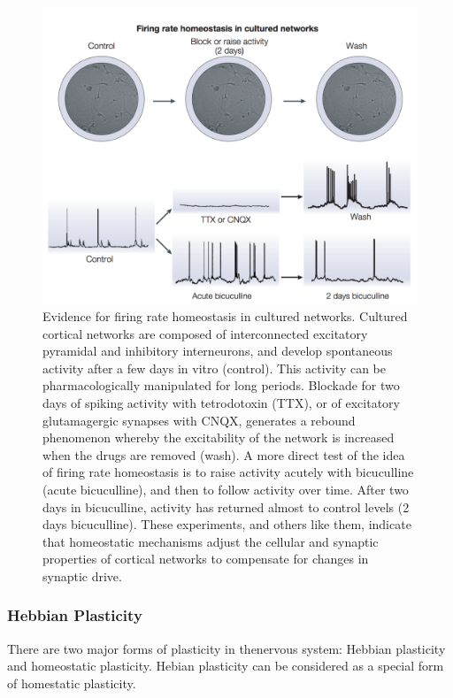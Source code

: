 \documentclass[main]{subfiles}
\begin{document}
\begin{figure}[H]
    \centering
    \includegraphics[width=.9\textwidth]{03_PlasticityInTheBrain/figures/firing_rate_homestatis.png}
    \caption{Evidence for firing rate homeostasis in cultured networks. Cultured cortical networks are composed of interconnected excitatory pyramidal and inhibitory interneurons, and develop spontaneous activity after a few days in vitro (control). This activity can be pharmacologically manipulated for long periods. Blockade for two days of spiking activity with tetrodotoxin (TTX), or of excitatory glutamagergic synapses with CNQX, generates a rebound phenomenon whereby the excitability of the network is increased when the drugs are removed (wash). A more direct test of the idea of firing rate homeostasis is to raise activity acutely with bicuculline (acute bicuculline), and then to follow activity over time. After two days in bicuculline, activity has returned almost to control levels (2 days bicuculline). These experiments, and others like them, indicate that homeostatic mechanisms adjust the cellular and synaptic properties of cortical networks to compensate for changes in synaptic drive.}
    \label{fig:homeostatis_cultured_nets}
\end{figure}





\subsubsection{Hebbian Plasticity}
There are two major forms of plasticity in thenervous system: Hebbian plasticity and homeostatic plasticity.  Hebian plasticity can be considered as a special form of homestatic plasticity. \\
\end{document}
